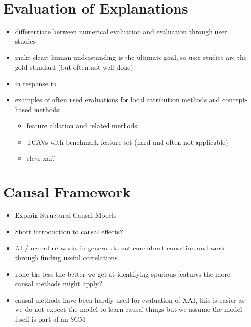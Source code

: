 \section{Evaluation of Explanations}
\begin{itemize}
    \item differentiate between numerical evaluation and evaluation through user studies
    \item make clear: human understanding is the ultimate goal, so user studies are the gold standard (but often not well done)
    \item in response to \cite{Sixt2020}
    \item examples of often used evaluations for local attribution methods and concept-based methods:
    \begin{itemize}
        \item feature ablation and related methods
        \item TCAVs \cite{Kim2018} with benchmark feature set (hard and often not applicable)
        \item clevr-xai? \cite{Arras2022}
        
    \end{itemize}
\end{itemize}


\section{Causal Framework}
\begin{itemize}
    \item Explain Structural Causal Models
    \item Short introduction to causal effects? 
    \item AI / neural networks in general do not care about causation and work through finding useful correlations
    \item none-the-less the better we get at identifying spurious features the more causal methods might apply? 
    \item causal methods have been hardly used for evaluation of XAI, this is easier as we do not expect the model to learn causal things but we assume the model itself is part of an SCM
\end{itemize}

